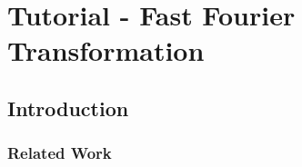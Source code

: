 \section{Tutorial - Fast Fourier Transformation }

\subsection{Introduction}

\begin{frame}
\frametitle{Related Work}



\end{frame}